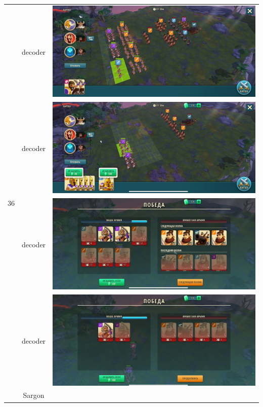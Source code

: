 \begin{longtable}{|c|c|c|}
    \hline
    \multirow{8}{*}{36} & decoder &
    \includegraphics[width=0.75\linewidth]{./parts/media/TreasureHunt/36/decoder/photo_2022-04-07_10-07-13.jpg} \\
    & decoder &
    \includegraphics[width=0.75\linewidth]{./parts/media/TreasureHunt/36/decoder/photo_2022-04-07_10-07-32.jpg} \\
    & decoder &
    \includegraphics[width=0.75\linewidth]{./parts/media/TreasureHunt/36/decoder/photo_2022-04-07_10-07-28.jpg} \\
    & decoder &
    \includegraphics[width=0.75\linewidth]{./parts/media/TreasureHunt/36/decoder/photo_2022-04-07_10-07-36.jpg} \\
    \hline
    \multirow{8}{*}{36} & Sargon &

\end{longtable}
